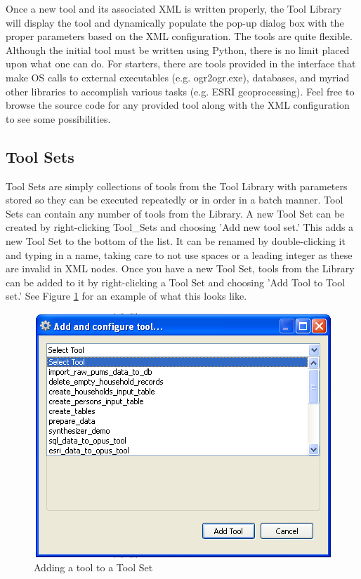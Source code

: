 Once a new tool and its associated XML is written properly, the Tool Library will display the tool and dynamically populate the pop-up dialog box with the proper parameters based on the XML configuration.  The tools are quite flexible.  Although the initial tool must be written using Python, there is no limit placed upon what one can do.  For starters, there are tools provided in the interface that make OS calls to external executables (e.g. ogr2ogr.exe), databases, and myriad other libraries to accomplish various tasks (e.g. ESRI geoprocessing).  Feel free to browse the source code for any provided tool along with the XML configuration to see some possibilities.

\subsection{Tool Sets}
Tool Sets are simply collections of tools from the Tool Library with parameters stored so they can be executed repeatedly or in order in a batch manner.  Tool Sets can contain any number of tools from the Library.  A new Tool Set can be created by right-clicking Tool_Sets and choosing 'Add new tool set.'  This adds a new Tool Set to the bottom of the list.  It can be renamed by double-clicking it and typing in a name, taking care to not use spaces or a leading integer as these are invalid in XML nodes.  Once you have a new Tool Set, tools from the Library can be added to it by right-clicking a Tool Set and choosing 'Add Tool to Tool set.'  See Figure \ref{addtool} for an example of what this looks like.

\begin{figure}[htp]
\begin{center}
\includegraphics[scale=0.8]{part-gui/images/data-manager-opus-tools-tab-add-tool-to-tool-set.png}
\end{center}
\caption{Adding a tool to a Tool Set}
\label{addtool}
\end{figure}

